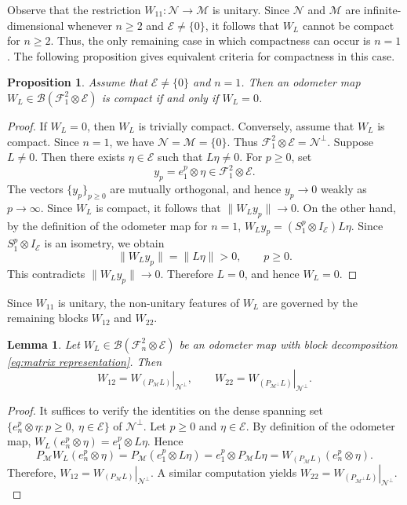 \documentclass[12pt]{amsart}
\newtheorem{lemma}[theorem]{Lemma}
\newtheorem{proposition}[theorem]{Proposition}
\theoremstyle{definition}
\theoremstyle{remark}
\newcommand{\clb}{\mathcal{B}}
\newcommand{\cle}{\mathcal{E}}
\newcommand{\clm}{\mathcal{M}}
\newcommand{\cln}{\mathcal{N}}
\newcommand{\clf}{\mathcal{F}}
\newcommand\restr[2]{\ensuremath{\left.#1\right|_{#2}}}
\numberwithin{equation}{section}
\begin{document}
Observe that the restriction \(W_{11}:\cln \to \clm\) is unitary. Since
\(\cln\) and \(\clm\) are infinite-dimensional whenever \(n\geq 2\) and
\(\cle\neq \{0\}\), it follows that \(W_L\) cannot be compact for \(n\geq 2\).
Thus, the only remaining case in which compactness can occur is \(n=1\).
The following proposition gives equivalent criteria for compactness in this case.


\begin{proposition}\label{prop:WL_compact}
Assume that \(\cle \neq \{0\}\) and \(n=1\). Then an odometer map
\(W_L \in \clb(\clf_1^2 \otimes \cle)\) is compact if and only if
\(W_L=0\).
\end{proposition}
\begin{proof}
If \(W_L=0\), then \(W_L\) is trivially compact.
Conversely, assume that \(W_L\) is compact. Since \(n=1\), we have
\(\cln=\clm=\{0\}\).
Thus $\clf_1^2\otimes\cle=\cln^\perp.$
Suppose \(L\neq0\). Then there exists
\(\eta\in\cle\) such that \(L\eta\neq0\). For \(p\ge0\), set
\[
y_p=e_1^p\otimes\eta\in \clf_1^2\otimes\cle.
\]
The vectors \(\{y_p\}_{p\ge0}\) are mutually orthogonal, and hence
\(y_p\to0\) weakly as \(p\to\infty\). Since \(W_L\) is compact, it follows
that $\|W_Ly_p\|\to0.$
On the other hand, by the definition of the odometer map for \(n=1\), $W_Ly_p
=
(S_1^p\otimes I_\cle)L\eta.$
Since \(S_1^p\otimes I_\cle\) is an isometry, we obtain
\[
\|W_Ly_p\|
=
\|L\eta\|
>0,
\qquad p\ge0.
\]
This contradicts \(\|W_Ly_p\|\to0\). 
Therefore $L=0$, and hence $W_L=0.$
\end{proof}

Since $W_{11}$ is unitary, the non-unitary features of \(W_L\) are governed by the remaining blocks
\(W_{12}\) and \(W_{22}\).
\begin{lemma} \label{lem:W12W22}
Let $W_L\in \clb(\clf_n^2\otimes \cle)$ be an odometer map with block decomposition \eqref{eq:matrix representation}. Then
\[
W_{12}=\restr{W_{(P_{\clm}L)}}{\cln^\perp},
\qquad
W_{22}=\restr{W_{(P_{\clm^\perp}L)}}{\cln^\perp}.
\]
\end{lemma}
\begin{proof}
It suffices to verify the identities on the dense spanning set $\{e_n^p\otimes \eta : p\ge 0,\ \eta\in\cle\}$
of $\cln^\perp$. Let $p\ge 0$ and $\eta\in\cle$. By definition of the odometer map, $W_L(e_n^p\otimes \eta)=e_1^p\otimes L\eta.$
Hence
\[
P_{\clm}W_L(e_n^p\otimes \eta)
=
P_{\clm}(e_1^p\otimes L\eta)
=
e_1^p\otimes P_{\clm}L\eta
=
W_{(P_{\clm}L)}(e_n^p\otimes \eta).
\]
Therefore, $W_{12}=\restr{W_{(P_{\clm}L)}}{\cln^\perp}.$
A similar computation yields $W_{22}=\restr{W_{(P_{\clm^\perp}L)}}{\cln^\perp}.$
\end{proof}
\end{document}
